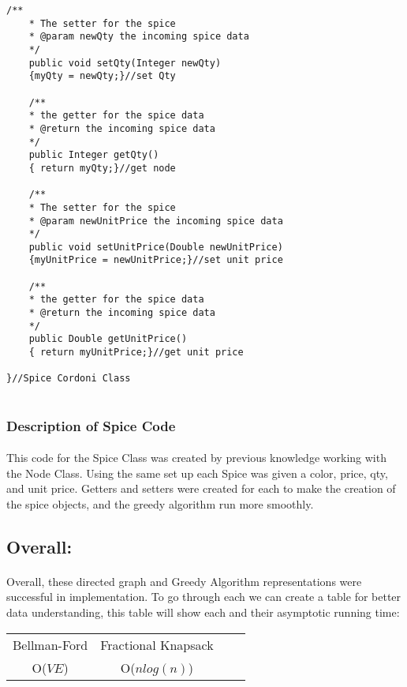 \documentclass[letterpaper, 10pt,DIV=13]{scrartcl}
\numberwithin{equation}{section} %
\numberwithin{figure}{section} %
\numberwithin{table}{section} %
\begin{document}
\begin{lstlisting}[frame=single, ]
    /**
    * The setter for the spice
    * @param newQty the incoming spice data
    */
    public void setQty(Integer newQty)
    {myQty = newQty;}//set Qty

    /**
    * the getter for the spice data 
    * @return the incoming spice data
    */
    public Integer getQty()
    { return myQty;}//get node

    /**
    * The setter for the spice
    * @param newUnitPrice the incoming spice data
    */
    public void setUnitPrice(Double newUnitPrice)
    {myUnitPrice = newUnitPrice;}//set unit price

    /**
    * the getter for the spice data 
    * @return the incoming spice data
    */
    public Double getUnitPrice()
    { return myUnitPrice;}//get unit price
    
}//Spice Cordoni Class


\end{lstlisting}

\subsubsection{Description of Spice Code}
\paragraph{} This code for the Spice Class was created by previous knowledge working with the Node Class. Using the same set up each Spice was given a color, price, qty, and unit price. Getters and setters were created for each to make the creation of the spice objects, and the greedy algorithm run more smoothly.


\subsection{Overall:}

\paragraph{} Overall, these directed graph and Greedy Algorithm representations were successful in implementation. To go through each we can create a table for better data understanding, this table will show each and their asymptotic running time:

\begin{center}
\begin{tabular}{ |c|c|c|c| } 
 \hline
 Bellman-Ford & Fractional Knapsack\\ 
 O($VE$) & O($nlog(n)$)\\ 
 \hline
\end{tabular}
\end{center}
\end{document}
